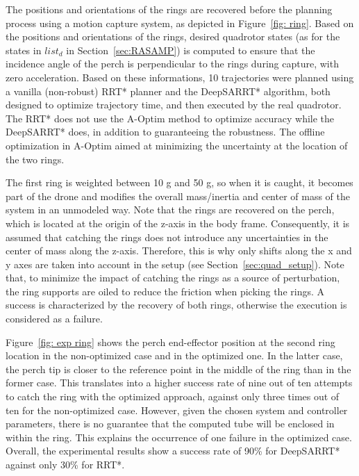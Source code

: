 The positions and orientations of the rings are recovered before the planning process using a motion capture system, as depicted in Figure~\ref{fig: ring}.
Based on the positions and orientations of the rings, desired quadrotor states (as for the states in $list_{d}$ in Section~\ref{sec:RASAMP}) is computed to ensure that the incidence angle of the perch is perpendicular to the rings during capture, with zero acceleration.
Based on these informations, 10 trajectories were planned using a vanilla (non-robust) RRT* planner and the DeepSARRT* algorithm, both designed to optimize trajectory time, and then executed by the real quadrotor.
The RRT* does not use the A-Optim method to optimize accuracy while the DeepSARRT* does, in addition to guaranteeing the robustness.
The offline optimization in A-Optim aimed at minimizing the uncertainty at the location of the two rings.

The first ring is weighted between 10 g and 50 g, so when it is caught, it becomes part of the drone and modifies the overall mass/inertia and center of mass of the system in an unmodeled way. 
Note that the rings are recovered on the perch, which is located at the origin of the z-axis in the body frame. 
Consequently, it is assumed that catching the rings does not introduce any uncertainties in the center of mass along the z-axis. 
Therefore, this is why only shifts along the x and y axes are taken into account in the setup (see Section~\ref{sec:quad_setup}).
Note that, to minimize the impact of catching the rings as a source of perturbation, the ring supports are oiled to reduce the friction when picking the rings.
A success is characterized by the recovery of both rings, otherwise the execution is considered as a failure.

Figure~\ref{fig: exp ring} shows the perch end-effector position at the second ring location in the non-optimized case and in the optimized one. 
In the latter case, the perch tip is closer to the reference point in the middle of the ring than in the former case. 
This translates into a higher success rate of nine out of ten attempts to catch the ring with the optimized approach, against only three times out of ten for the non-optimized case.
However, given the chosen system and controller parameters, there is no guarantee that the computed tube will be enclosed in within the ring.
This explains the occurrence of one failure in the optimized case.
Overall, the experimental results show a success rate of 90\% for DeepSARRT* against only 30\% for RRT*.

